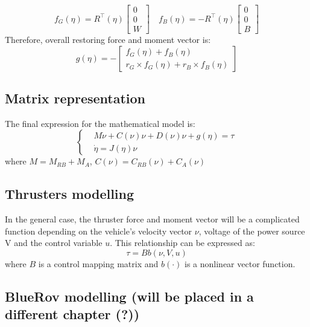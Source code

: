 $$
f_G\left(\eta\right)=R^{\top}\left(\eta\right)\left[\begin{array}{l}
0 \\
0 \\
W
\end{array}\right] \quad f_B\left(\eta\right)=-R^{\top}\left(\eta\right)\left[\begin{array}{l}
0 \\
0 \\
B
\end{array}\right]
$$
Therefore, overall restoring force and moment vector is:
$$
g(\eta)=-\left[\begin{array}{c}
f_G(\eta)+f_B(\eta) \\
r_G \times f_G(\eta)+r_B \times f_B(\eta)
\end{array}\right]
$$

\subsection*{Matrix representation}

The final expression for the mathematical model is:
$$
\begin{cases}
& M \dot{\nu}+C(\nu) \nu+D(\nu) \nu+g(\eta)=\tau \\
& \dot{\eta}=J(\eta) \nu
\end{cases}
$$
where
$M=M_{R B}+M_A$, $C(\nu)=C_{R B}(\nu)+C_A(\nu)$

\subsection*{Thrusters modelling}

In the general case, the thruster force and moment vector will be 
a complicated function depending on the vehicle's velocity vector $\nu$, 
voltage of the power source V 
and the control variable $u$.
This relationship can be expressed as:
$$
\tau=Bb(\nu, V, u)
$$
where $B$ is a control mapping matrix and
$b(\cdot)$ is a nonlinear vector function.

\subsection*{BlueRov modelling (will be placed in a different chapter (?))}

